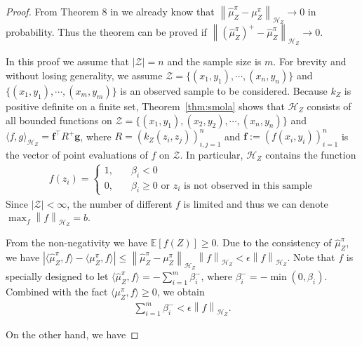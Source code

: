 \documentclass[a4paper]{article}
\renewcommand{\bf}{\mathbf}
\renewcommand{\cal}{\mathcal}
\newcommand{\bb}{\mathbb}
\newcommand{\norm}[1]{\left\lVert#1\right\rVert}
\newcommand{\T}{\intercal}
\newcommand{\thmref}[1]{Theorem~\ref{#1}}
\begin{document}
\begin{proof}
From Theorem 8 in \cite{fukumizu2011kernel} we already know that $\norm{\widehat{\mu}_Z^\pi-\mu_Z^\pi}_{\cal{H}_Z} \rightarrow 0$ in probability. Thus the theorem can be proved if $\norm{(\widehat{\mu}_Z^{\pi})^+ - \widehat{\mu}_Z^\pi}_{\cal{H}_Z} \rightarrow 0$. 

In this proof we assume that $|\cal{Z}| = n$ and the sample size is $m$. For brevity and without losing generality, we assume $\cal{Z} = \{ (x_1,y_1),\cdots,(x_n,y_n) \}$ and $\{ (x_1,y_1),\cdots,(x_m,y_m) \}$ is an observed sample to be considered. Because $k_Z$ is positive definite on a finite set, \thmref{thm:smola} shows that $\cal{H}_Z$ consists of all bounded functions on $\cal{Z} = \{ (x_1,y_1),(x_2,y_2),\cdots,(x_n,y_n) \}$ and $\langle f,g\rangle_{\cal{H}_Z} = \bf{f}^\T R^+ \bf{g}$, where $R = (k_Z(z_i,z_j))_{i,j=1}^n$ and $\bf{f}:=(f(x_i,y_i))_{i=1}^n$ is the vector of point evaluations of $f$ on $\cal{Z}$. In particular, $\cal{H}_Z$ contains the function
\begin{align}
f(z_i) = \begin{cases}
1, \quad &\beta_i < 0\\
0,\quad &\text{$\beta_i \geq 0$ or $z_i$ is not observed in this sample}
\end{cases}
\end{align}
Since $|\cal{Z}|<\infty$, the number of different $f$ is limited and thus we can denote $\max_f \norm{f}_{\cal{H}_Z} = b$.

From the non-negativity we have $\bb{E}[f(Z)] \geq 0$. Due to the consistency of $\widehat{\mu}_Z^\pi$, we have $|\langle \widehat{\mu}_Z^\pi, f\rangle - \langle \mu_Z^\pi, f\rangle| \leq \norm{\widehat{\mu}_Z^\pi-\mu_Z^\pi}_{\cal{H}_Z}\norm{f}_{\cal{H}_Z} < \epsilon\norm{f}_{\cal{H}_Z}$. Note that $f$ is specially designed to let $\langle \widehat{\mu}_Z^\pi ,f\rangle = - \sum_{i=1}^m \beta_i^-$, where $\beta_i^- = -\min(0,\beta_i)$. Combined with the fact $\langle \mu_Z^\pi,f\rangle \geq 0$, we obtain
\begin{align}
\sum_{i=1}^m \beta_i^- < \epsilon \norm{f}_{\cal{H}_Z}.
\end{align}

On the other hand, we have


\end{proof}
\end{document}
